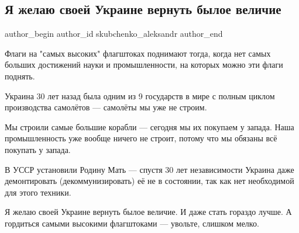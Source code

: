  
 
 
 
 
 
\subsection{Я желаю своей Украине вернуть былое величие}
\label{sec:23_08_2021.fb.skubchenko_aleksandr.1.velichie_nezalezhnist}
 
\ifcmt
 author_begin
   author_id skubchenko_aleksandr
 author_end
\fi

Флаги на "самых высоких" флагштоках поднимают тогда, когда нет самых больших
достижений науки и промышленности, на которых можно эти флаги поднять. 

Украина 30 лет назад была одним из 9 государств в мире с полным циклом
производства самолётов — самолёты мы уже не строим. 

Мы строили самые большие корабли — сегодня мы их покупаем у запада. Наша
промышленность уже вообще ничего не строит, потому что мы обязаны всё покупать
у запада. 

В УССР установили Родину Мать — спустя 30 лет независимости Украина даже
демонтировать (декоммунизировать) её не в состоянии, так как нет необходимой
для этого техники. 

Я желаю своей Украине вернуть былое величие. И даже стать гораздо лучше. А
гордиться самыми высокими флагштоками — увольте, слишком мелко.
